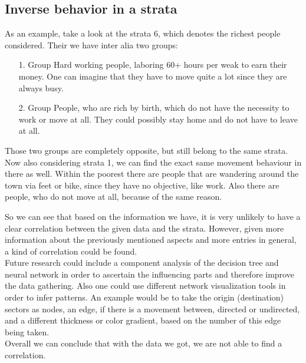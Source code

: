 	\subsection{Inverse behavior in a strata}
	As an example, take a look at the strata 6, which denotes the richest people considered. Their we have inter alia two groups: 
	\begin{enumerate}
		\setlength{\itemindent}{1cm}
		\item[1. Group]
		Hard working people, laboring 60+ hours per weak to earn their money. One can imagine that they have to move quite a lot since they are always busy.
		\item[2. Group]
		People, who are rich by birth, which do not have the necessity to work or move at all. They could possibly stay home and do not have to leave at all.
	\end{enumerate} 
	Those two groups are completely opposite, but still belong to the same strata. Now also considering strata 1, we can find the exact same movement behaviour in there as well. Within the poorest there are people that are wandering around the town via feet or bike, since they have no objective, like work. Also there are people, who do not move at all, because of the same reason.	
	
	So we can see that based on the information we have, it is very unlikely to have a clear correlation between the given data and the strata. However, given more information about the previously mentioned aspects and more entries in general, a kind of correlation could be found.\\
	Future research could include a component analysis of the decision tree and neural network in order to ascertain the influencing parts and therefore improve the data gathering. Also one could use different network visualization tools in order to infer patterns. An example would be to take the origin (destination) sectors as nodes, an edge, if there is a movement between, directed or undirected, and a different thickness or color gradient, based on the number of this edge being taken.\\
	
	Overall we can conclude that with the data we got, we are not able to find a correlation.